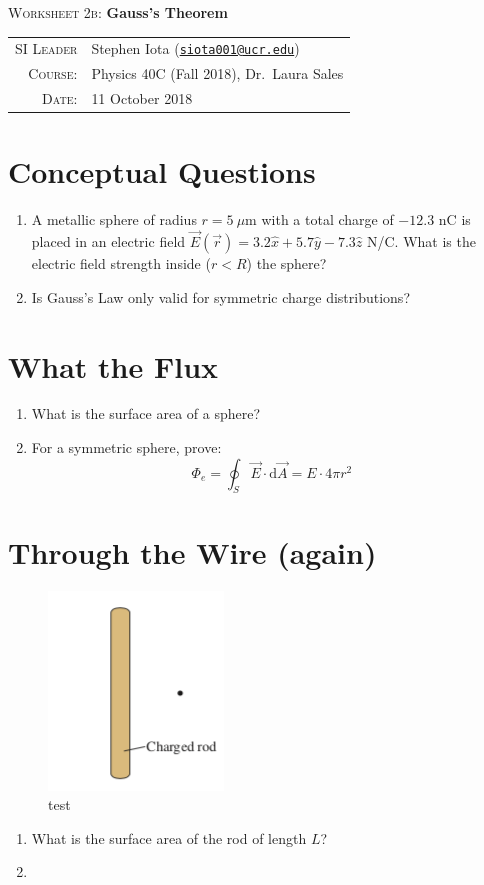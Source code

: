 \documentclass[11pt]{article}
\newcommand{\email}[1]{\texttt{\href{mailto:#1}{#1}}}
\begin{document}
\begin{center}

\Large{\textsc{Worksheet 2b}: \textbf{Gauss's Theorem}}

\end{center}

\vspace{.5mm}


\begin{tabular}{rl}
\textsc{SI Leader}
&
Stephen Iota (\email{siota001@ucr.edu})
\\
\textsc{Course}:
&
Physics 40C (Fall 2018), Dr.~Laura Sales
\\
\textsc{Date}:
&
11 October 2018
\end{tabular}



\section{Conceptual Questions}

\begin{enumerate}[label=(\alph*)]

\item A metallic sphere of radius $r = 5 \ \mu$m with a total charge of $-12.3$ nC is placed in an electric field $\vec{E}(\vec{r}) = 3.2 \hat{x} + 5.7 \hat{y}  - 7.3 \hat{z}$ N/C. What is the electric field strength inside ($r<R$) the sphere?
\item Is Gauss's Law only valid for symmetric charge distributions?  	

\end{enumerate}

 
\section{What the Flux}

\begin{enumerate}[label=(\alph*)]
	
\item What is the surface area of a sphere?

\item For a symmetric sphere, prove: 
$$\Phi_{e} = \oint_{S} \vec{E} \cdot \mathrm{d}\vec{A} = E\cdot4\pi r^2 $$ 
	
\end{enumerate}

\section{Through the Wire (again)}
\begin{figure}[h!]
\includegraphics[width=.2\linewidth]{W2a_fig2}
\caption{test}	
\end{figure}

\begin{enumerate}[label=(\alph*)]
	\item What is the surface area of the rod of length $L$?
	\item 
\end{enumerate}
\end{document}
